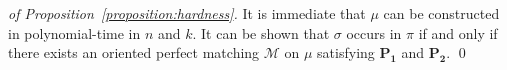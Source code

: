 \documentclass[a4paper]{llncs}
\begin{document}
\begin{proof}[of Proposition~\ref{proposition:hardness}]
  It is immediate that $\mu$ can be constructed in polynomial-time in $n$ and $k$.
  It can be shown
  that $\sigma$ occurs in $\pi$ if and only if
  there exists an oriented perfect matching $\mathcal{M}$ on $\mu$
  satisfying $\mathbf{P_1}$ and $\mathbf{P_2}$.
  \qed
\end{proof}


%
%
%
%
\end{document}
